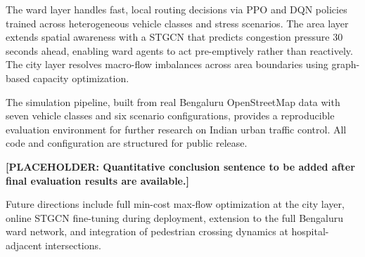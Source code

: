 \documentclass[conference]{IEEEtran}
\begin{document}
The ward layer handles fast, local routing decisions via PPO and DQN policies
trained across heterogeneous vehicle classes and stress scenarios. The area
layer extends spatial awareness with a STGCN that predicts congestion pressure
30 seconds ahead, enabling ward agents to act pre-emptively rather than
reactively. The city layer resolves macro-flow imbalances across area
boundaries using graph-based capacity optimization.

The simulation pipeline, built from real Bengaluru OpenStreetMap data with
seven vehicle classes and six scenario configurations, provides a
reproducible evaluation environment for further research on Indian urban
traffic control. All code and configuration are structured for public release.

\textbf{[PLACEHOLDER: Quantitative conclusion sentence to be added
after final evaluation results are available.]}

Future directions include full min-cost max-flow optimization at the city
layer, online STGCN fine-tuning during deployment, extension to the full
Bengaluru ward network, and integration of pedestrian crossing dynamics
at hospital-adjacent intersections.


\end{document}
